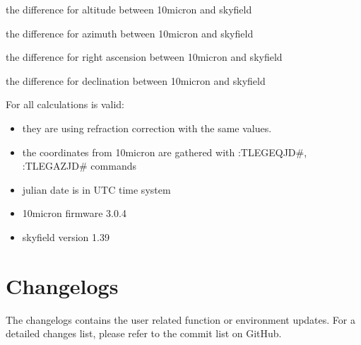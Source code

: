 \documentclass[a4paper,10pt,english]{sphinxmanual}
\begin{document}
\sphinxAtStartPar
the difference for altitude between 10micron and skyfield


\sphinxAtStartPar
the difference for azimuth between 10micron and skyfield


\sphinxAtStartPar
the difference for right ascension between 10micron and skyfield


\sphinxAtStartPar
the difference for declination between 10micron and skyfield


\sphinxAtStartPar
For all calculations is valid:
\begin{itemize}
\item {} 
\sphinxAtStartPar
they are using refraction correction with the same values.

\item {} 
\sphinxAtStartPar
the coordinates from 10micron are gathered with :TLEGEQJD\#, :TLEGAZJD\# commands

\item {} 
\sphinxAtStartPar
julian date is in UTC time system

\item {} 
\sphinxAtStartPar
10micron firmware 3.0.4

\item {} 
\sphinxAtStartPar
skyfield version 1.39

\end{itemize}

\sphinxstepscope


\section{Changelogs}
\label{\detokenize{changelog/index:changelogs}}\label{\detokenize{changelog/index::doc}}
\sphinxAtStartPar
The changelogs contains the user related function or environment updates. For a
detailed changes list, please refer to the commit list on GitHub.
\end{document}
